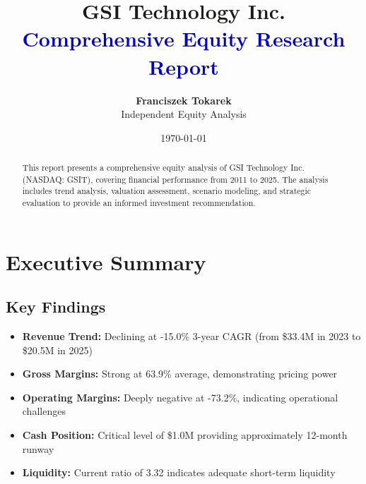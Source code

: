\documentclass[11pt,a4paper]{article}
\title{
    \vspace{2cm}
    {\Huge\bfseries GSI Technology Inc.}\\[0.5cm]
    {\Large\textcolor{mediumblue}{Comprehensive Equity Research Report}}\\[2cm]
}
\author{
    {\Large\textbf{Franciszek Tokarek}}\\[0.3cm]
    {\normalsize Independent Equity Analysis}
}
\date{\today}
\begin{document}
\maketitle
\thispagestyle{empty}

\begin{abstract}
This report presents a comprehensive equity analysis of GSI Technology Inc. (NASDAQ: GSIT), 
covering financial performance from 2011 to 2025. The analysis includes trend analysis, 
valuation assessment, scenario modeling, and strategic evaluation to provide an informed 
investment recommendation.
\end{abstract}

\newpage

\tableofcontents

\newpage

\section{Executive Summary}

\begin{center}
\end{center}

\vspace{0.8cm}

\subsection{Key Findings}

\begin{itemize}
\setlength{\itemsep}{0.4em}
\item \textbf{Revenue Trend:} Declining at -15.0\% 3-year CAGR (from \$33.4M in 2023 to \$20.5M in 2025)
\item \textbf{Gross Margins:} Strong at 63.9\% average, demonstrating pricing power
\item \textbf{Operating Margins:} Deeply negative at -73.2\%, indicating operational challenges
\item \textbf{Cash Position:} Critical level of \$1.0M providing approximately 12-month runway
\item \textbf{Liquidity:} Current ratio of 3.32 indicates adequate short-term liquidity
\end{itemize}
\end{document}
